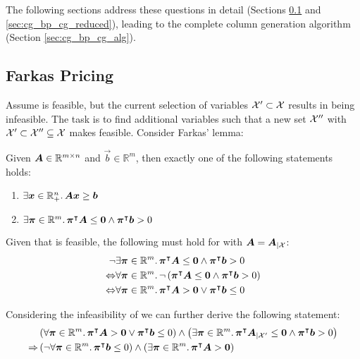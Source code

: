The following sections address these questions in detail (Sections \ref{sec:cg_bp_cg_farkas} and \ref{sec:cg_bp_cg_reduced}), leading to the complete column generation algorithm (Section \ref{sec:cg_bp_cg_alg}).

\subsection{Farkas Pricing}\label{sec:cg_bp_cg_farkas}
Assume \MP{} is feasible, but the current selection of variables $\mathcal{X}' \subset \mathcal{X}$ results in \RMP{} being infeasible. The task is to find additional variables such that a new set $\mathcal{X}''$ with $\mathcal{X}' \subset \mathcal{X}'' \subseteq \mathcal{X}$ makes \RMP{} feasible. Consider Farkas' lemma:

\begin{theorem}\label{th:farkas_lemma}
Given ${\bm{A}} \in \mathbb{R}^{m \times n}$ and $\vec{b} \in \mathbb{R}^m$, then exactly one of the following statements holds:
\begin{enumerate}
	\item $\exists {\bm{x}} \in \mathbb{R}_+^n. \, {\bm{A}} {\bm{x}} \geq {\bm{b}}$
	\item $\exists {\bm{\pi}} \in \mathbb{R}^m. \, {\bm{\pi}}^\intercal {\bm{A}} \leq {\bm{0}} \land {\bm{\pi}}^\intercal {\bm{b}} > 0$
\end{enumerate}
\end{theorem}

Given that \MP{} is feasible, the following must hold for \MP{} with ${\bm{A}} = {\bm{A}}_{\vert \mathcal{X}}$:
\begin{equation}
\begin{aligned}
\neg & \exists {\bm{\pi}} \in \mathbb{R}^m. \, {\bm{\pi}}^\intercal {\bm{A}} \leq {\bm{0}} \land {\bm{\pi}}^\intercal {\bm{b}} > 0 \\
\Leftrightarrow & \forall {\bm{\pi}} \in \mathbb{R}^m. \, \neg \left( {\bm{\pi}}^\intercal {\bm{A}} \leq {\bm{0}} \land {\bm{\pi}}^\intercal {\bm{b}} > 0 \right)\\
\Leftrightarrow & \forall {\bm{\pi}} \in \mathbb{R}^m. \, {\bm{\pi}}^\intercal {\bm{A}} > {\bm{0}} \lor {\bm{\pi}}^\intercal {\bm{b}} \leq 0
\end{aligned}
\end{equation}

Considering the infeasibility of \RMP{} we can further derive the following statement:
\begin{equation}
\begin{aligned}
& \left( \forall {\bm{\pi}} \in \mathbb{R}^m. \, {\bm{\pi}}^\intercal {\bm{A}} > {\bm{0}} \lor {\bm{\pi}}^\intercal {\bm{b}} \leq 0 \right) \land \left( \exists {\bm{\pi}} \in \mathbb{R}^m. \, {\bm{\pi}}^\intercal {\bm{A}}_{\vert \mathcal{X}'} \leq {\bm{0}} \land {\bm{\pi}}^\intercal {\bm{b}} > 0 \right) \\
\Rightarrow & \left( \neg \forall {\bm{\pi}} \in \mathbb{R}^m. \, {\bm{\pi}}^\intercal {\bm{b}} \leq 0 \right) \land \left( \exists {\bm{\pi}} \in \mathbb{R}^m. \, {\bm{\pi}}^\intercal {\bm{A}} > {\bm{0}} \right)
\end{aligned}
\end{equation}


